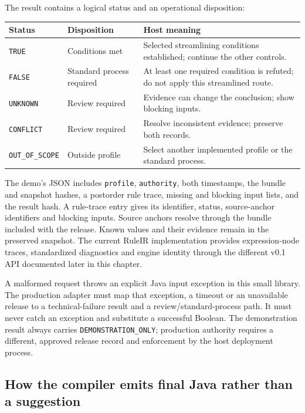 \documentclass[12pt,a4paper,oneside,openany]{book}
\begin{document}
The result contains a logical status and an operational disposition:
\begin{center}\small
\begin{tabularx}{\textwidth}{P{0.18\textwidth}P{0.34\textwidth}Y}
\toprule Status & Disposition & Host meaning \\\midrule
\texttt{TRUE} & Conditions met & Selected streamlining conditions established; continue the other controls.\\
\texttt{FALSE} & Standard process required & At least one required condition is refuted; do not apply this streamlined route.\\
\texttt{UNKNOWN} & Review required & Evidence can change the conclusion; show blocking inputs.\\
\texttt{CONFLICT} & Review required & Resolve inconsistent evidence; preserve both records.\\
\texttt{OUT\_OF\_SCOPE} & Outside profile & Select another implemented profile or the standard process.\\
\bottomrule
\end{tabularx}
\end{center}
The demo's JSON includes \texttt{profile}, \texttt{authority}, both timestamps,
the bundle and snapshot hashes, a postorder rule trace, missing and blocking
input lists, and the result hash. A rule-trace entry gives its identifier,
status, source-anchor identifiers and blocking inputs. Source anchors resolve
through the bundle included with the release. Known values and their evidence
remain in the preserved snapshot. The current RuleIR implementation provides expression-node traces,
standardized diagnostics and engine identity through the different v0.1 API
documented later in this chapter.

A malformed request throws an explicit Java input exception in this small
library. The production adapter must map that exception, a timeout or an
unavailable release to a technical-failure result and a review/standard-process
path. It must never catch an exception and substitute a successful Boolean.
The demonstration result always carries \texttt{DEMONSTRATION\_ONLY}; production
authority requires a different, approved release record and enforcement by the
host deployment process.

\subsection{How the compiler emits final Java rather than a suggestion}
\label{merge:P-03d-java-delivery:03}
\end{document}
